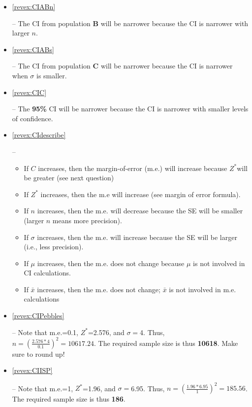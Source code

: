 \documentclass[10pt,openany]{book}\usepackage[]{graphicx}\usepackage[]{color}
\begin{document}
\begin{itemize}
  \item \hypertarget{ans:CIABn}{\ref{revex:CIABn}} -- The CI from population \textbf{B} will be narrower because the CI is narrower with larger $n$.
  \item \hypertarget{ans:CIABs}{\ref{revex:CIABs}} -- The CI from population \textbf{C} will be narrower because the CI is narrower when $\sigma$ is smaller.
  \item \hypertarget{ans:CIC}{\ref{revex:CIC}} -- The \textbf{95\%} CI will be narrower because the CI is narrower with smaller levels of confidence.
  \item \hypertarget{ans:CIdescribe}{\ref{revex:CIdescribe}} --
    \begin{itemize}
      \item If $C$ increases, then the margin-of-error (m.e.) will increase because $Z^{*}$will be greater (see next question)
      \item If $Z^{*}$ increases, then the m.e will increase (see margin of error formula).
      \item If $n$ increases, then the m.e. will decrease because the SE will be smaller (larger $n$ means more precision).
      \item If $\sigma$ increases, then the m.e. will increase because the SE will be larger (i.e., less precision).
      \item If $\mu$ increases, then the m.e. does not change because $\mu$ is not involved in CI calculations.
      \item If $\bar{x}$ increases, then the m.e. does not change; $\bar{x}$ is not involved in m.e. calculations
    \end{itemize}
  \item \hypertarget{ans:CIPebbles}{\ref{revex:CIPebbles}} -- Note that m.e.=0.1, $Z^{*}$=2.576, and $\sigma=$4.  Thus, $n=\left(\frac{2.576*4}{0.1}\right)^{2}=10617.24$.  The required sample size is thus \textbf{10618}.  Make sure to round up!
  \item \hypertarget{ans:CIISP}{\ref{revex:CIISP}} -- Note that m.e.=1, $Z^{*}$=1.96, and $\sigma=$6.95.  Thus, $n=\left(\frac{1.96*6.95}{1}\right)^{2}=185.56$.  The required sample size is thus \textbf{186}.


\end{itemize}
\end{document}
